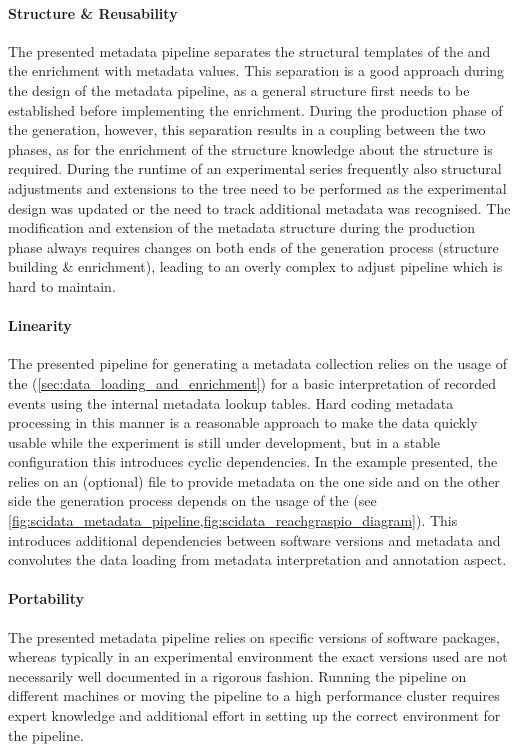 \paragraph{Structure \& Reusability} The presented metadata pipeline separates the structural templates of the  and the enrichment with metadata values. This separation is a good approach during the design of the metadata pipeline, as a general structure first needs to be established before implementing the enrichment. During the production phase of the  generation, however, this separation results in a coupling between the two phases, as for the enrichment of the  structure knowledge about the structure is required. During the runtime of an experimental series frequently also structural adjustments and extensions to the  tree need to be performed as the experimental design was updated or the need to track additional metadata was recognised. The modification and extension of the metadata structure during the production phase always requires changes on both ends of the  generation process (structure building \& enrichment), leading to an overly complex to adjust pipeline which is hard to maintain.

\paragraph{Linearity}
The presented pipeline for generating a metadata collection relies on the usage of the  (\cref{sec:data_loading_and_enrichment}) for a basic interpretation of recorded events using the internal metadata lookup tables. Hard coding metadata processing in this manner is a reasonable approach to make the data quickly usable while the experiment is still under development, but in a stable configuration this introduces cyclic dependencies. In the example presented, the  relies on an (optional)  file to provide metadata on the one side and on the other side the  generation process depends on the usage of the  (see \cref{fig:scidata_metadata_pipeline,fig:scidata_reachgraspio_diagram}). This introduces additional dependencies between software versions and metadata and convolutes the data loading from metadata interpretation and annotation aspect.

\paragraph{Portability} The presented metadata pipeline relies on specific versions of software packages, whereas typically in an experimental environment the exact versions used are not necessarily well documented in a rigorous fashion. Running the pipeline on different machines or moving the pipeline to a high performance cluster requires expert knowledge and additional effort in setting up the correct environment for the pipeline.


